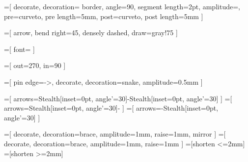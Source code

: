 =[
  decorate,
  decoration={
    border, angle=90, segment length=2pt, amplitude=\pgflinewidth,
    pre=curveto, pre length=5mm, post=curveto, post length=5mm
  }
]

=[
  arrow,
  bend right=45,
  densely dashed,
  draw=gray!75
]

=[
  font=\small
]

=[
  out=270,
  in=90
]

=[
  pin edge={->, decorate, decoration={snake, amplitude=0.5mm}}
]

=[
  arrows={Stealth[inset=0pt, angle'=30]-Stealth[inset=0pt, angle'=30]}
]
=[
  arrows={Stealth[inset=0pt, angle'=30]-}
]
=[
  arrows={-Stealth[inset=0pt, angle'=30]}
]

\newcommand{\bottommeasure}[4][5mm] {
  \begin{scope}[line width=0.1mm]
    \coordinate (x) at ([yshift=-#1] #3);
    \draw (x) [measure] -- node [label={[label distance=-1mm]above:#2}] {} (x -| #4);
    \draw (#3) -- ++(0, -#1) -- +(0, -1.25mm);
    \draw (#4) -- ++(0, -#1) -- +(0, -1.25mm);
  \end{scope}
}

\newcommand{\rightbottommeasure}[4][5mm] {
\begin{scope}[line width=0.1mm]
  \draw (#3) -- ++(0, -#1) -- ++(0, 1.25mm) coordinate(x);
  \draw (x) [direct measure] -- +(-3mm, 0);
  \draw (#4) -- ++(0, -#1) -- ++(0, 1.25mm) coordinate(x);
  \draw (x) [direct measure] -- node [label={[label distance=-1mm]above:#2}] {} +(8mm, 0);
\end{scope}
}

\newcommand{\topmeasure}[4][5mm] {
  \begin{scope}[line width=0.1mm]
    \coordinate (x) at ([yshift=#1] #3);
    \draw (x) [measure] -- node [label={[label distance=-1mm]above:#2}] {} (x -| #4);
    \draw (#3) -- ++(0, #1) -- +(0, 1.25mm);
    \draw (#4) -- ++(0, #1) -- +(0, 1.25mm);
  \end{scope}
}

=[
  decorate, decoration={brace, amplitude=1mm, raise=1mm, mirror}
]
=[
  decorate, decoration={brace, amplitude=1mm, raise=1mm}
]
=[shorten <=2mm]
=[shorten >=2mm]

\newcommand{\bracetobrace}[4] {
  \coordinate (a) at (#1);
  \coordinate (b) at (#2);
  \coordinate (c) at (#3);
  \coordinate (d) at (#4);
  \draw [bottombrace] (a) -- coordinate (e) (b);
  \draw [topbrace] (c) -- coordinate (f) (d);
  \draw [from brace, to brace, smooth, arrow] (e) to (f);
}

\newcommand{\toppointer}[2] {
  \draw ([yshift=1mm] #1) [Latex-] -- ([yshift=9mm] #1) node [anchor=south] {#2};
}

\newcommand{\topinject}[2] {
  \draw ([yshift=-4mm] #1) [Latex-, white border, draw=black] -- ([yshift=6mm] #1) node [anchor=south] {#2};
}
